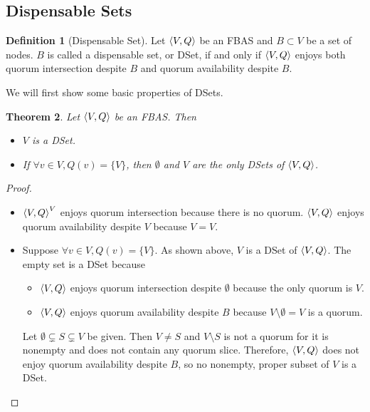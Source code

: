 \documentclass[12pt, psamsfonts]{amsart}
\newtheorem{thm}{Theorem}[subsection]
\theoremstyle{definition}
\newtheorem{defn}[thm]{Definition}
\theoremstyle{remark}
\numberwithin{equation}{subsection}
\begin{document}
\newpage
\subsection{Dispensable Sets}

\begin{defn}[Dispensable Set]\label{def_dset}
    Let $\ev{V, Q}$ be an FBAS and $B \subset V$ be a set of nodes.
    $B$ is called a dispensable set, or DSet, if and only if $\ev{V, Q}$ enjoys both quorum intersection despite $B$ and quorum availability despite $B$.
\end{defn}

We will first show some basic properties of DSets.
\begin{thm}
    Let $\ev{V, Q}$ be an FBAS.
    Then
    \begin{itemize}
        \item
            $V$ is a DSet.
        \item
            If $\forall v \in V, Q(v) = \{ V \}$, then $\emptyset$ and $V$ are the only DSets of $\ev{V, Q}$.
    \end{itemize}
\end{thm}

\begin{proof}
    $ $
    \begin{itemize}
        \item
            $\ev{V, Q}^V$ enjoys quorum intersection because there is no quorum.
            $\ev{V, Q}$ enjoys quorum availability despite $V$ because $V = V$.
        \item
            Suppose $\forall v \in V, Q(v) = \{ V \}$.
            As shown above, $V$ is a DSet of $\ev{V, Q}$.
            The empty set is a DSet because
            \begin{itemize}
                \item
                    $\ev{V, Q}$ enjoys quorum intersection despite $\emptyset$ because the only quorum is $V$.
                \item
                    $\ev{V, Q}$ enjoys quorum availability despite $B$ because $V \setminus \emptyset = V$ is a quorum.
            \end{itemize}
            Let $\emptyset \subsetneq S \subsetneq V$ be given.
            Then $V \ne S$ and $V \setminus S$ is not a quorum for it is nonempty and does not contain any quorum slice.
            Therefore, $\ev{V, Q}$ does not enjoy quorum availability despite $B$, so no nonempty, proper subset of $V$ is a DSet.
    \end{itemize}
\end{proof}
\end{document}
